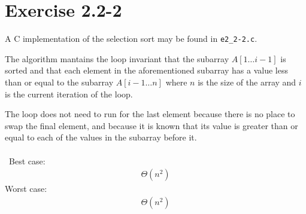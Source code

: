 \documentclass{article}
\begin{document}
\section*{Exercise 2.2-2}

A C implementation of the selection sort may be found in \texttt{e2\_2-2.c}.

The algorithm mantains the loop invariant that the subarray $A[1 \ldots i-1]$ is sorted and that each element in the aforementioned subarray has a value less than or equal to the subarray $A[i-1 \ldots n]$ where $n$ is the size of the array and $i$ is the current iteration of the loop.

The loop does not need to run for the last element because there is no place to swap the final element, and because it is known that its value is greater than or equal to each of the values in the subarray before it.
\\ \\
\noindent~Best case:
\begin{eqnarray*}
	\Theta(n^2)
\end{eqnarray*}
Worst case:
\begin{eqnarray*}
	\Theta(n^2)
\end{eqnarray*}
\end{document}
